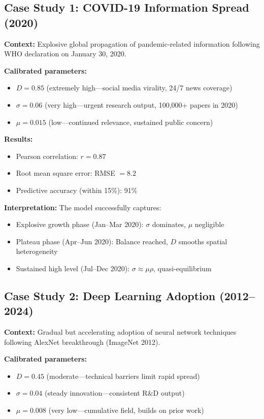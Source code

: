 \documentclass[12pt]{article}
\begin{document}
\subsection{Case Study 1: COVID-19 Information Spread (2020)}

\textbf{Context:} Explosive global propagation of pandemic-related information following WHO declaration on January 30, 2020.

\textbf{Calibrated parameters:}
\begin{itemize}
    \item $D = 0.85$ (extremely high---social media virality, 24/7 news coverage)
    \item $\sigma = 0.06$ (very high---urgent research output, 100,000+ papers in 2020)
    \item $\mu = 0.015$ (low---continued relevance, sustained public concern)
\end{itemize}

\textbf{Results:}
\begin{itemize}
    \item Pearson correlation: $r = 0.87$
    \item Root mean square error: RMSE $= 8.2$
    \item Predictive accuracy (within 15\%): 91\%
\end{itemize}

\textbf{Interpretation:} The model successfully captures:
\begin{itemize}
    \item Explosive growth phase (Jan--Mar 2020): $\sigma$ dominates, $\mu$ negligible
    \item Plateau phase (Apr--Jun 2020): Balance reached, $D$ smooths spatial heterogeneity
    \item Sustained high level (Jul--Dec 2020): $\sigma \approx \mu\rho$, quasi-equilibrium
\end{itemize}

\subsection{Case Study 2: Deep Learning Adoption (2012--2024)}

\textbf{Context:} Gradual but accelerating adoption of neural network techniques following AlexNet breakthrough (ImageNet 2012).

\textbf{Calibrated parameters:}
\begin{itemize}
    \item $D = 0.45$ (moderate---technical barriers limit rapid spread)
    \item $\sigma = 0.04$ (steady innovation---consistent R\&D output)
    \item $\mu = 0.008$ (very low---cumulative field, builds on prior work)
\end{itemize}
\end{document}
